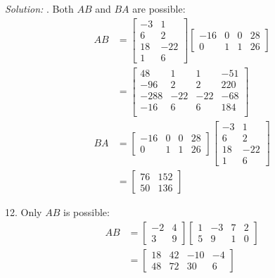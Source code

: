 \documentclass[11pt]{homework}
\begin{document}
\emph{Solution:}
. Both $AB$ and $BA$ are possible:
\begin{align*}
AB &= 
  \begin{bmatrix}
    -3 & 1 \\
    6 & 2 \\
    18 & -22 \\
    1 & 6
  \end{bmatrix}
  \begin{bmatrix}
    -16 & 0 & 0 & 28 \\
    0   & 1 & 1 & 26 
  \end{bmatrix} \\
&= 
  \begin{bmatrix}
    48 & 1 & 1 & -51 \\
    -96 & 2 & 2 & 220 \\
    -288 & -22 & -22 & -68 \\
    -16 & 6 & 6 & 184 \\
  \end{bmatrix} \\
BA &= 
  \begin{bmatrix}
    -16 & 0 & 0 & 28 \\
    0   & 1 & 1 & 26 
  \end{bmatrix} 
  \begin{bmatrix}
    -3 & 1 \\
    6 & 2 \\
    18 & -22 \\
    1 & 6
  \end{bmatrix} \\
&= 
  \begin{bmatrix}
    76 & 152 \\
    50 & 136
  \end{bmatrix} 
\end{align*}

12. Only $AB$ is possible:
\begin{align*}
AB &= 
  \begin{bmatrix}
    -2 & 4 \\
    3 & 9 
  \end{bmatrix}
  \begin{bmatrix}
    1 & -3 & 7 & 2 \\
    5 & 9 & 1 & 0 
  \end{bmatrix} \\
& = 
  \begin{bmatrix}
    18 & 42 & -10 & -4 \\
    48 & 72 & 30 & 6
  \end{bmatrix}
\end{align*}
\end{document}
